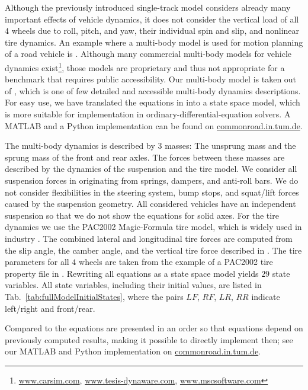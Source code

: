 \documentclass[11pt,a4paper]{article}
\renewcommand{\^}[1]{^{(#1)}}
\begin{document}
Although the previously introduced single-track model considers already many important effects of vehicle dynamics, it does not consider the vertical load of all $4$ wheels due to roll, pitch, and yaw, their individual spin and slip, and nonlinear tire dynamics. An example where a multi-body model is used for motion planning of a road vehicle is \cite{Bertolazzi2007}. Although many commercial multi-body models for vehicle dynamics exist\footnote{\href{https://www.carsim.com/}{www.carsim.com}, \href{https://www.tesis-dynaware.com}{www.tesis-dynaware.com}, \href{http://www.mscsoftware.com/de/product/adams}{www.mscsoftware.com}}, those models are proprietary and thus not appropriate for a benchmark that requires public accessibility. Our multi-body model is taken out of \cite[Appendix A]{Allen1992}, which is one of few detailed and accessible multi-body dynamics descriptions. For easy use, we have translated the equations in \cite[Appendix A]{Allen1992} into a state space model, which is more suitable for implementation in ordinary-differential-equation solvers. A MATLAB and a Python implementation can be found on \href{http://commonroad.in.tum.de}{commonroad.in.tum.de}. 

The multi-body dynamics is described by $3$ masses: The unsprung mass and the sprung mass of the front and rear axles. The forces between these masses are described by the dynamics of the suspension and the tire model. We consider all suspension forces in \cite[Appendix A]{Allen1992} originating from springs, dampers, and anti-roll bars. We do not consider flexibilities in the steering system, bump stops, and squat/lift forces caused by the suspension geometry. All considered vehicles have an independent suspension so that we do not show the equations for solid axes. For the tire dynamics we use the PAC2002 Magic-Formula tire model, which is widely used in industry \cite{Adams2011}. The combined lateral and longitudinal tire forces are computed from the slip angle, the camber angle, and the vertical tire force described in \cite[Appendix A]{Allen1992}. The tire parameters for all $4$ wheels are taken from the example of a PAC2002 tire property file in \cite{Adams2011}. Rewriting all equations as a state space model yields $29$ state variables. All state variables, including their initial values, are listed in Tab.~\ref{tab:fullModelInitialStates}, where the pairs $LF$, $RF$, $LR$, $RR$ indicate left/right and front/rear. 

Compared to \cite[Appendix A]{Allen1992} the equations are presented in an order so that equations depend on previously computed results, making it possible to directly implement then; see our MATLAB and Python implementation on \href{http://commonroad.in.tum.de}{commonroad.in.tum.de}. 
\end{document}
